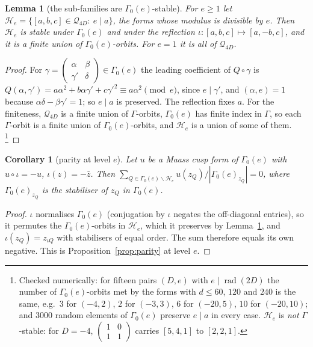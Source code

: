 \documentclass[11pt,a4paper]{article}
\newtheorem{lemma}[theorem]{Lemma}
\newtheorem{corollary}[theorem]{Corollary}
\theoremstyle{remark}\newtheorem{remark}[theorem]{Remark}
\begin{document}
\begin{lemma}[the sub-families are $\Gamma_0(e)$-stable]\label{lem:subfamily}
For $e\ge1$ let $\mathcal H_e=\{[a,b,c]\in\mathcal Q_{4D}:\ e\mid a\}$, the forms whose modulus is divisible by $e$. Then
$\mathcal H_e$ is stable under $\Gamma_0(e)$ and under the reflection $\iota:[a,b,c]\mapsto[a,-b,c]$, and it is a finite
union of $\Gamma_0(e)$-orbits. For $e=1$ it is all of $\mathcal Q_{4D}$.
\end{lemma}
\begin{proof}
For $\gamma=\left(\begin{smallmatrix}\alpha&\beta\\ \gamma'&\delta\end{smallmatrix}\right)\in\Gamma_0(e)$ the
leading coefficient of $Q\circ\gamma$ is $Q(\alpha,\gamma')=a\alpha^2+b\alpha\gamma'+c\gamma'^2\equiv a\alpha^2\pmod e$,
since $e\mid\gamma'$, and $(\alpha,e)=1$ because $\alpha\delta-\beta\gamma'=1$; so $e\mid a$ is preserved. The
reflection fixes $a$. For the finiteness, $\mathcal Q_{4D}$ is a finite union of $\Gamma$-orbits, $\Gamma_0(e)$ has
finite index in $\Gamma$, so each $\Gamma$-orbit is a finite union of $\Gamma_0(e)$-orbits, and $\mathcal H_e$ is a
union of some of them. \footnote{Checked numerically: for fifteen pairs $(D,e)$ with $e\mid\operatorname{rad}(2D)$ the
number of $\Gamma_0(e)$-orbits met by the forms with $d\le60$, $120$ and $240$ is the same, e.g.\ $3$ for $(-4,2)$, $2$
for $(-3,3)$, $6$ for $(-20,5)$, $10$ for $(-20,10)$; and $3000$ random elements of $\Gamma_0(e)$ preserve $e\mid a$ in
every case. $\mathcal H_e$ is \emph{not} $\Gamma$-stable: for $D=-4$,
$\left(\begin{smallmatrix}1&0\\1&1\end{smallmatrix}\right)$ carries $[5,4,1]$ to $[2,2,1]$.}
\end{proof}

\begin{corollary}[parity at level $e$]\label{cor:parity-e}
Let $u$ be a Maass cusp form of $\Gamma_0(e)$ with $u\circ\iota=-u$, $\iota(z)=-\bar z$. Then
$\sum_{Q\in\Gamma_0(e)\backslash\mathcal H_e}u(z_Q)/|\Gamma_0(e)_{z_Q}|=0$, where $\Gamma_0(e)_{z_Q}$ is the
stabiliser of $z_Q$ in $\Gamma_0(e)$.
\end{corollary}
\begin{proof}
$\iota$ normalises $\Gamma_0(e)$ (conjugation by $\iota$ negates the off-diagonal entries), so it permutes the
$\Gamma_0(e)$-orbits in $\mathcal H_e$, which it preserves by Lemma~\ref{lem:subfamily}, and $\iota(z_Q)=z_{\iota Q}$
with stabilisers of equal order. The sum therefore equals its own negative. This is Proposition~\ref{prop:parity} at
level $e$.
\end{proof}
\end{document}
